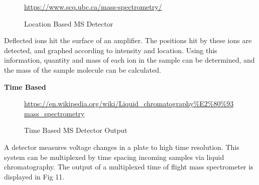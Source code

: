 \documentclass[letterpaper, 10 pt, conference]{ieeeconf}  %
\begin{document}
            \begin{figure}[h]
                \centering
            
                \caption{Location Based MS Detector}

                \tiny{\url{https://www.scq.ubc.ca/mass-spectrometry/​}}

            \end{figure}

            Deflected ions hit the surface of an amplifier. The positions hit by these ions are detected, and graphed according to intensity and location. Using this information, quantity and mass of each ion in the sample can be determined, and the mass of the sample molecule can be calculated.

            \textbf{Time Based}

            \begin{figure}[h]
                \centering
            
                \caption{Time Based MS Detector Output}

                \tiny{\url{https://en.wikipedia.org/wiki/Liquid_chromatography%E2%80%93mass_spectrometry​}}

            \end{figure}

            A detector measures voltage changes in a plate to high time resolution. This system can be multiplexed by time spacing incoming samples via liquid chromatography. The output of a multiplexed time of flight mass spectrometer is displayed in Fig 11.
\end{document}
